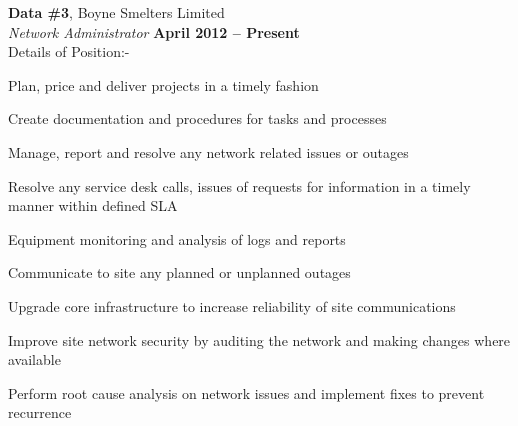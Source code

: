 \documentclass[margin,line]{resume}
\begin{document}
\begin{resume}
    {\bf Data \#3}, Boyne Smelters Limited \vspace{2mm}\\\vspace{1mm}%
    {\sl Network Administrator} \hfill {\bf April 2012 -- Present}\\
    Details of Position:-
    \begin{list2}
        \vspace*{1mm}
\item Plan, price and deliver projects in a timely fashion
\item Create documentation and procedures for tasks and processes
\item Manage, report and resolve any network related issues or outages
\item Resolve any service desk calls, issues of requests for information in a timely manner within defined SLA
\item Equipment monitoring and analysis of logs and reports
\item Communicate to site any planned or unplanned outages
\item Upgrade core infrastructure to increase reliability of site communications
\item Improve site network security by auditing the network and making changes where available
\item Perform root cause analysis on network issues and implement fixes to prevent recurrence
\end{list2}


\end{resume}
\end{document}
